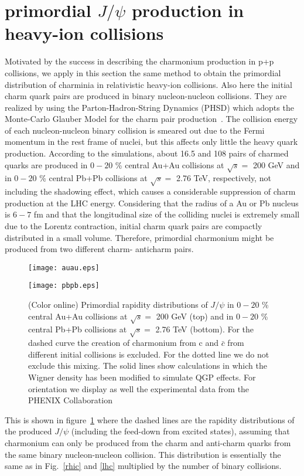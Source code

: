 \documentclass[twocolumn,aps,superscriptaddress,showpacs,nofootinbib,floatfix]{revtex4}
\begin{document}
\section{primordial $J/\psi$ production in heavy-ion collisions}\label{hic}

Motivated by the success in describing the charmonium production in p+p collisions, we apply in this section the same method to obtain the primordial distribution of charminia in relativistic heavy-ion collisions. Also here the initial charm quark pairs are produced in binary  nucleon-nucleon collisions. They are realized by using the Parton-Hadron-String Dynamics (PHSD) which adopts the Monte-Carlo Glauber Model for the charm pair production~\cite{Song:2015sfa,Song:2015ykw}.
The collision energy of each nucleon-nucleon binary collision is smeared out  due to the Fermi momentum in the rest frame of nuclei, but this affects only little the heavy quark production.
According to the simulations, about 16.5 and 108 pairs of charmed quarks  are produced in $0-20$ \% central Au+Au collisions at $\sqrt{s}=$ 200 GeV and in $0-20$ \% central Pb+Pb collisions at $\sqrt{s}=$ 2.76 TeV, respectively, not including the shadowing effect, which causes a considerable suppression of charm production at the LHC energy.
Considering that the radius of a Au or Pb nucleus is $6-7$ fm and that the longitudinal size of the colliding nuclei is extremely small due to the Lorentz contraction, initial charm quark pairs are compactly distributed in a small volume.
Therefore,  primordial charmonium might be produced from two different charm- anticharm pairs.


\begin{figure}[!h]
\centerline{
\texttt{[image: auau.eps]}}
\centerline{
\texttt{[image: pbpb.eps]}}
\caption{(Color online) Primordial rapidity distributions of $J/\psi$ in $0-20$ \% central Au+Au collisions at $\sqrt{s}=$ 200 GeV (top) and in $0-20$ \% central Pb+Pb collisions at $\sqrt{s}=$ 2.76 TeV (bottom). For the dashed curve the creation of charmonium from
c and $\bar c$ from different initial collisions is excluded.  For the dotted line we do not exclude this mixing. The solid lines show calculations in which the Wigner density has been modified to simulate QGP effects. For orientation we display as well the experimental data from the PHENIX Collaboration~\cite{Adare:2006ns} }
\label{fhic}
\end{figure}

This is shown in figure~\ref{fhic} where the dashed lines are the rapidity distributions  of  the produced $J/\psi$ (including the feed-down from excited states), assuming that charmonium can only be produced from the charm and anti-charm quarks from the same binary nucleon-nucleon collision. This distribution is essentially the same as in Fig.~\ref{rhic} and \ref{lhc} multiplied by the number of binary collisions.
\end{document}
